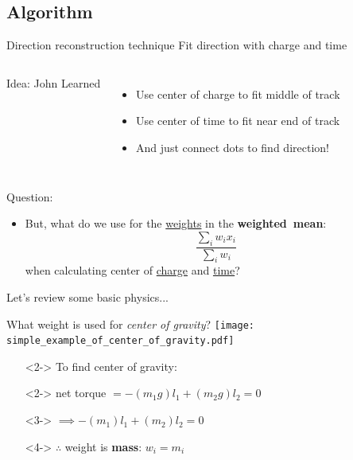 \documentclass[14pt]{beamer}
\begin{document}
\subsection{Algorithm}
\begin{frame}{Direction reconstruction technique}
	{Fit direction with {\color{magenta}charge} and {\color{blue}time}}
	\centering
	\begin{columns}[t]
		\begin{block}{}
			\centering

			{\footnotesize Idea: John Learned}
		\end{block}
		\begin{itemize}
			\item<2-> Use {\color{magenta}center of charge} to fit middle of
				track
			\item<3-> Use {\color{blue}center of time} to fit near end of track
			\item<4-> And just connect dots to find direction!
		\end{itemize}
	\end{columns}
\end{frame}

\begin{frame}{Question:}
	\begin{itemize}
		\item<2-> {
				But, what do we use for the \underline{weights} in the
				\textbf{weighted~mean}:
				\begin{equation*}
					\frac{\sum_{i} w_{i}x_{i}}{\sum_{i} w_{i}}
				\end{equation*}
				when calculating center of {\color{magenta}\underline{charge}} and
				{\color{blue}\underline{time}}?
			}
	\end{itemize}
\end{frame}

\begin{frame}
	\centering
	{\huge Let's review some basic physics...}
\end{frame}

\begin{frame}{What weight is used for \emph{center of gravity}?}
	\texttt{[image: simple\_example\_of\_center\_of\_gravity.pdf]}
	\begin{itemize}
		\item[]<2-> To find center of gravity:
		\item[]<2-> net torque $= -(m_1 g) l_1 + (m_2 g) l_2 = 0$
		\item[]<3-> $\implies -(m_1) l_1 + (m_2) l_2 = 0$
		\item[]<4-> $\therefore$ weight is \textbf{mass}: $w_{i} = m_{i}$
	\end{itemize}
\end{frame}
\end{document}
